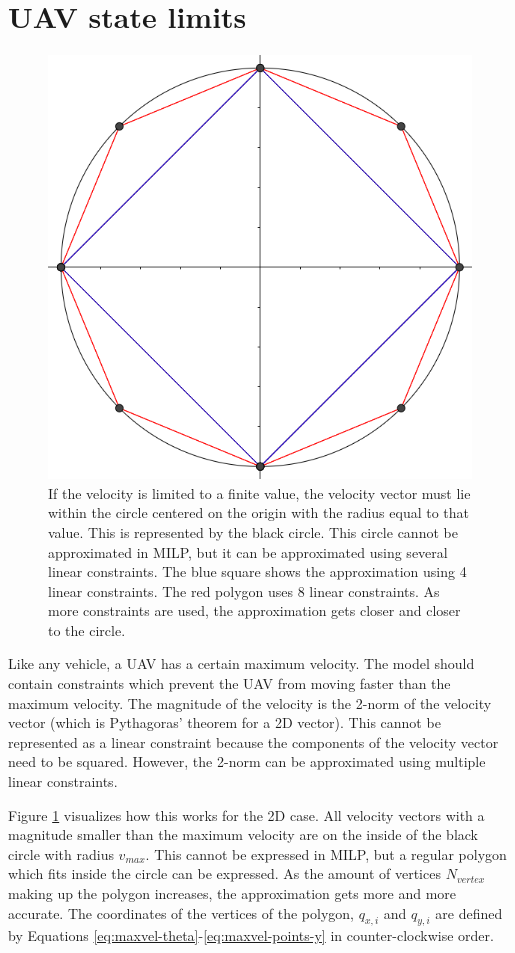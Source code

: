 \section{UAV state limits}
\label{subsec:state-limits}
\begin{figure}
    \centering
        \includegraphics[width=0.4\columnwidth]{img/circlelinear}
    \caption[A visualization of the linear approximation for the 2-norm]{If the velocity is limited to a finite value, the velocity vector must lie within the circle centered on the origin with the radius equal to that value. This is represented by the black circle. This circle cannot be approximated in MILP, but it can be approximated using several linear constraints. The blue square shows the approximation using 4 linear constraints. The red polygon uses 8 linear constraints. As more constraints are used, the approximation gets closer and closer to the circle. }\label{fig:circlelinear}
\end{figure}
Like any vehicle, a UAV has a certain maximum velocity. The model should contain constraints which prevent the UAV from moving faster than the maximum velocity. The magnitude of the velocity is the 2-norm of the velocity vector (which is Pythagoras' theorem for a 2D vector). This cannot be represented as a linear constraint because the components of the velocity vector need to be squared. However, the 2-norm can be approximated using multiple linear constraints. 
\par
Figure \ref{fig:circlelinear} visualizes how this works for the 2D case. All velocity vectors with a magnitude smaller than the maximum velocity are on the inside of the black circle with radius $v_{max}$. This cannot be expressed in MILP, but a regular polygon which fits inside the circle can be expressed. As the amount of vertices $N_{vertex}$ making up the polygon increases, the approximation gets more and more accurate. The coordinates of the vertices of the polygon, $q_{x,i}$ and $q_{y,i}$ are defined by Equations \ref{eq:maxvel-theta}-\ref{eq:maxvel-points-y} in counter-clockwise order.

